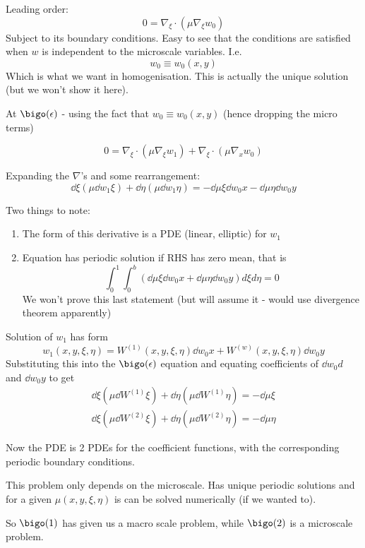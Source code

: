 \documentclass{X:/Documents/Coding/Latex/myassignment}
\begin{document}
Leading order:
\[0 = \nabla_\xi \cdot (\mu\nabla_\xi w_0)\]
Subject to its boundary conditions. Easy to see that the conditions are satisfied when $w$ is independent to the microscale variables. I.e.
\[w_0 \equiv w_0(x,y)\]
Which is what we want in homogenisation. This is actually the unique solution (but we won't show it here).


At $\bigo(\epsilon)$ - using the fact that $w_0 \equiv w_0(x,y)$ (hence dropping the micro terms)

\[0 = \nabla_\xi \cdot (\mu \nabla_\xi w_1) + \nabla_\xi \cdot(\mu \nabla_x w_0)\]

Expanding the $\nabla$'s and some rearrangement:
\[\dd{}\xi \left(\mu \dd{w_1}{\xi}\right) + \dd{}\eta \left(\mu \dd{w_1}{\eta}\right) = -\dd\mu\xi \dd{w_0}x - \dd{\mu}{\eta} \dd{w_0}{y}\]

Two things to note:

\begin{enumerate}
    \item The form of this derivative is a PDE (linear, elliptic) for $w_1$ 
    \item Equation has periodic solution if RHS has zero mean, that is
    \[\int_0^1 \int_0^b \left(\dd\mu\xi \dd{w_0}{x} + \dd{\mu}{\eta} \dd{w_0}{y}\right) d\xi d\eta = 0\]
    We won't prove this last statement (but will assume it - would use divergence theorem apparently)
\end{enumerate}

Solution of $w_1$ has form
\[w_1(x,y,\xi,\eta) = W^{(1)} (x,y,\xi,\eta) \dd{w_0}{x} + W^{(w)} (x,y,\xi,\eta) \dd{w_0}{y}\]
Substituting this into the $\bigo(\epsilon)$ equation and equating coefficients of $\dd{w_0}{d}$ and $\dd{w_0}{y}$ to get
\begin{align*}
    \dd{}{\xi} \left(\mu \dd{W^{(1)}}{\xi}\right) + \dd{}\eta \left(\mu \dd{W^{(1)}}{\eta}\right) = -\dd{\mu}{\xi}\\
    \dd{}{\xi} \left(\mu \dd{W^{(2)}}{\xi}\right) + \dd{}\eta \left(\mu \dd{W^{(2)}}{\eta}\right) = -\dd{\mu}{\eta}
\end{align*}

Now the PDE is 2 PDEs for the coefficient functions, with the corresponding periodic boundary conditions.

This problem only depends on the microscale. Has unique periodic solutions and for a given $\mu(x,y,\xi,\eta)$ is can be solved numerically (if we wanted to).

So  $\bigo(1)$ has given us a macro scale problem, while $\bigo(2)$ is a microscale problem.
\end{document}
